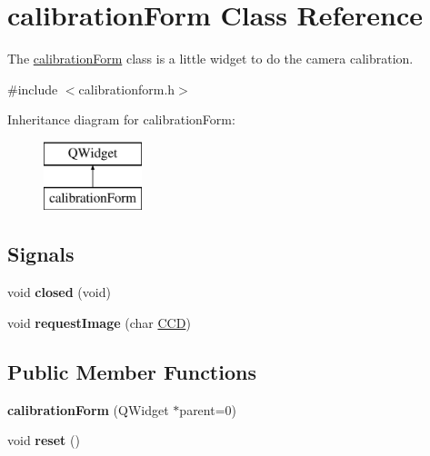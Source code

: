 \hypertarget{classcalibration_form}{}\section{calibration\+Form Class Reference}
\label{classcalibration_form}


The \hyperlink{classcalibration_form}{calibration\+Form} class is a little widget to do the camera calibration.  




{\ttfamily \#include $<$calibrationform.\+h$>$}

Inheritance diagram for calibration\+Form\+:\begin{figure}[H]
\begin{center}
\leavevmode
\includegraphics[height=2.000000cm]{classcalibration_form}
\end{center}
\end{figure}
\subsection*{Signals}
\begin{DoxyCompactItemize}
\item 
\hypertarget{classcalibration_form_a4b69dd9a448eb4ae87cab5d2cfcf120b}{}void {\bfseries closed} (void)\label{classcalibration_form_a4b69dd9a448eb4ae87cab5d2cfcf120b}

\item 
\hypertarget{classcalibration_form_a2efdd56cb4d8f8a5174a1c562fd9c279}{}void {\bfseries request\+Image} (char \hyperlink{classcalibration_form_ae670e129fa413d10ac54ce1d0e06bb4b}{C\+C\+D})\label{classcalibration_form_a2efdd56cb4d8f8a5174a1c562fd9c279}

\end{DoxyCompactItemize}
\subsection*{Public Member Functions}
\begin{DoxyCompactItemize}
\item 
\hypertarget{classcalibration_form_a904475e56443f8002f554b2333224bbb}{}{\bfseries calibration\+Form} (Q\+Widget $\ast$parent=0)\label{classcalibration_form_a904475e56443f8002f554b2333224bbb}

\item 
\hypertarget{classcalibration_form_a70baa4a45e9f1df59e0484918977fef1}{}void {\bfseries reset} ()\label{classcalibration_form_a70baa4a45e9f1df59e0484918977fef1}

\end{DoxyCompactItemize}

